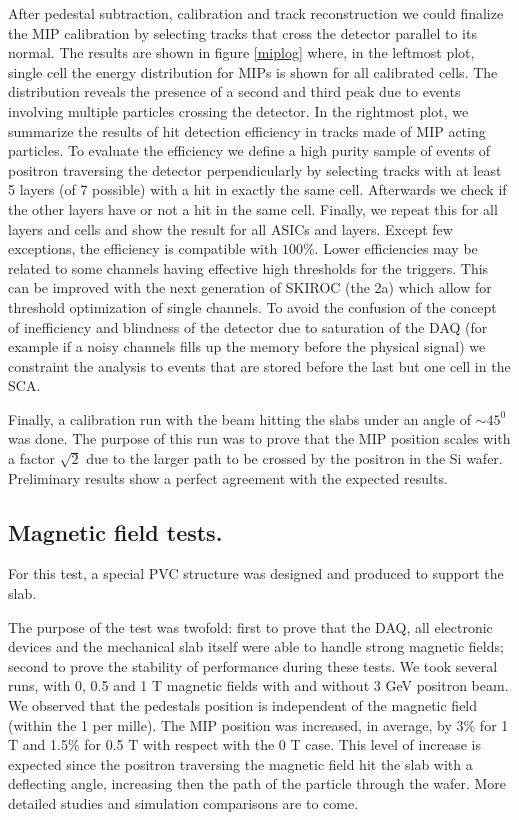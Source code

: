 \documentclass[a4paper,11pt]{article}
\begin{document}
After pedestal subtraction, calibration and track reconstruction we could finalize the MIP calibration by selecting tracks that cross the detector parallel to its normal.
The results are shown in figure \ref{miplog} where, in the leftmost plot, single cell the energy distribution for MIPs is shown for all calibrated cells. 
The distribution reveals the presence of a second and third peak due to events involving multiple particles crossing the detector.
In the rightmost plot, we
summarize the results of hit detection efficiency in tracks made of MIP acting particles. To evaluate the efficiency we define a high purity sample of
events of positron traversing the detector perpendicularly by selecting
tracks with at least 5 layers (of 7 possible) with a hit in exactly the same cell. Afterwards we check if the other layers have or not a hit in the same cell. Finally, we repeat this for all layers and cells and show the result for all ASICs and layers. Except few exceptions, the efficiency is compatible with $100\%$.
Lower efficiencies may be related to some channels having effective high thresholds for the triggers.
This can be improved with the next generation of SKIROC (the 2a) which allow for threshold optimization of single channels.
To avoid the confusion of the concept of inefficiency and blindness of the detector due to saturation of the DAQ
(for example if a noisy channels fills up the memory before the physical signal) we constraint the analysis to events that are stored before the last but one cell in the SCA.

Finally, a calibration run with the beam hitting the slabs under an angle of $\sim 45^{0}$ was done.
The purpose of this run was to prove that the MIP position scales with a factor $\sqrt{2}$
due to the larger path to be crossed by the positron in the Si wafer.
Preliminary results show a perfect agreement with the expected results.


\subsection{Magnetic field tests.}

For this test, a special PVC structure was
designed and produced to support the slab.

The purpose of the test was twofold: first to prove that the DAQ, all electronic devices and the mechanical slab itself were able
to handle strong magnetic fields; second to prove the stability of performance during these tests.
We took several runs, with 0, 0.5 and 1 T magnetic fields with and without 3 GeV positron beam.
We observed that the pedestals position is independent of the magnetic field (within the 1 per mille). The MIP position was increased, in average,
by 3\% for 1 T and 1.5\% for 0.5 T with respect with the 0 T case.
This level of increase is expected since the positron traversing the magnetic field hit the slab with a deflecting angle,
increasing then the path of the particle through the wafer. More detailed studies and simulation comparisons are to come.
\end{document}
